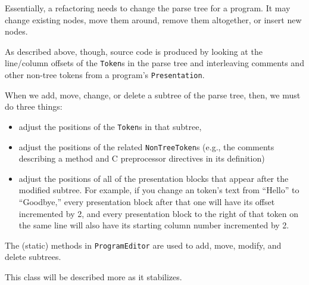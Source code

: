 Essentially, a refactoring needs to change the parse tree for a program.  It
may change existing nodes, move them around, remove them altogether, or insert
new nodes.

As described above, though, source code is produced by looking at the line/column
offsets of the \texttt{Token}s in the parse tree and interleaving comments and
other non-tree tokens from a program's \texttt{Presentation}.

When we add, move, change, or delete a subtree of the parse tree, then,
we must do three things:
\begin{itemize}
\item adjust the positions of the \texttt{Token}s in that subtree,
\item adjust the positions of the related \texttt{NonTreeToken}s
(e.g., the comments describing a method and C preprocessor directives in its
definition)
\item adjust the positions of all of the presentation blocks that appear after
the modified subtree.  For example, if you change an token's text from
``Hello'' to ``Goodbye,'' every presentation block after that one will have
its offset incremented by 2, and every presentation block to the right of
that token on the same line will also have its starting column number incremented
by 2.
\end{itemize}

The (static) methods in \texttt{ProgramEditor} are used to add, move, modify,
and delete subtrees.

This class will be described more as it stabilizes.
